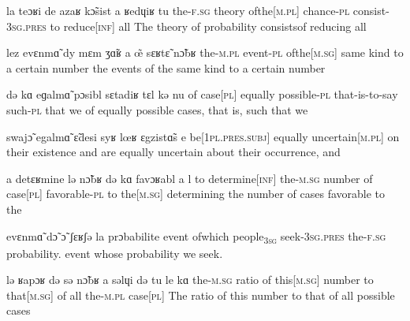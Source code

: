 
              {la teɔʁi de azaʁ {k\~{ɔ}sist\liaison} a ʁedɥiʁ tu}
              {the-\textsc{f}.\textsc{sg} theory {of{\textunderscore}the[\textsc{m}.\textsc{pl}]} chance-\textsc{pl} consist-3\textsc{sg}.\textsc{pres} to {reduce[\textsc{inf}]} all}
              {The theory of probability {consists{\textunderscore}of}  reducing all}

              {{lez\liaison} evɛnm\~{ɑ} dy mɛm {ʒ\~{ɑ}ʁ\liaison} a \~{œ} sɛʁt\~{ɛ} n\~{ɔ}bʁ}
              {the-\textsc{m}.\textsc{pl} event-\textsc{pl} {of{\textunderscore}the[\textsc{m}.\textsc{sg}]} same kind to a certain number}
              {the events of the same kind to a certain number}

              {də kɑ eɡalm\~{ɑ} pɔsibl sɛtadiʁ tɛl kə nu}
              {of {case[\textsc{pl}]} equally possible-\textsc{pl} that-is-to-say such-\textsc{pl} that we}
              {of equally possible cases, that is, such that we}

              {swaj\~{ɔ} egalm\~{ɑ} \~{ɛ}desi syʁ {lœʁ\liaison} ɛgzist\~{ɑ}s e}
              {{be[1\textsc{pl}.\textsc{pres}.\textsc{subj}]} equally {uncertain[\textsc{m}.\textsc{pl}]} on their existence and}
              {are equally uncertain about their occurrence, and}

              {a detɛʁmine lə n\~{ɔ}bʁ də kɑ {favɔʁabl\liaison} a {l{\liaison}}}
              {to {determine[\textsc{inf}]} the-\textsc{m}.\textsc{sg} number of {case[\textsc{pl}]} favorable-\textsc{pl} to {the[\textsc{m}.\textsc{sg}]}}
              {determining the number of cases favorable to the}

              {evɛnm\~{ɑ} d\~{ɔ} \~{ɔ} ʃɛʁʃə la prɔbabilite}
              {event of{\textunderscore}which {people\textsubscript{3\textsc{sg}}} seek-3\textsc{sg}.\textsc{pres} {the-\textsc{f}.\textsc{sg}} probability.}
              {event whose probability we seek.}

              {lə ʁapɔʁ də sə {n\~{ɔ}bʁ{\liaison}} a səlɥi də tu le kɑ}
              {the-\textsc{m}.\textsc{sg} ratio of {this[\textsc{m}.\textsc{sg}]} number to {that[\textsc{m}.\textsc{sg}]} of all {the-\textsc{m}.\textsc{pl}} {case[\textsc{pl}]}}
              {The ratio of this number to that of all possible cases}

